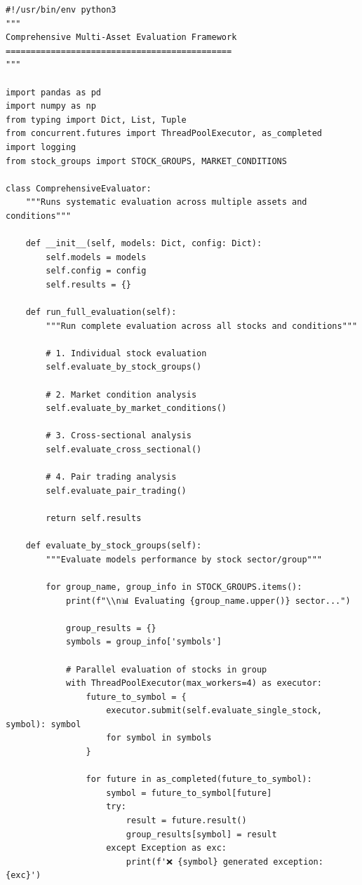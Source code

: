 \documentclass[11pt]{article}
\begin{document}
\begin{lstlisting}[style=pythonstyle, caption=Multi-Asset Evaluation Framework]
#!/usr/bin/env python3
"""
Comprehensive Multi-Asset Evaluation Framework
=============================================
"""

import pandas as pd
import numpy as np
from typing import Dict, List, Tuple
from concurrent.futures import ThreadPoolExecutor, as_completed
import logging
from stock_groups import STOCK_GROUPS, MARKET_CONDITIONS

class ComprehensiveEvaluator:
    """Runs systematic evaluation across multiple assets and conditions"""
    
    def __init__(self, models: Dict, config: Dict):
        self.models = models
        self.config = config
        self.results = {}
        
    def run_full_evaluation(self):
        """Run complete evaluation across all stocks and conditions"""
        
        # 1. Individual stock evaluation
        self.evaluate_by_stock_groups()
        
        # 2. Market condition analysis
        self.evaluate_by_market_conditions()
        
        # 3. Cross-sectional analysis
        self.evaluate_cross_sectional()
        
        # 4. Pair trading analysis
        self.evaluate_pair_trading()
        
        return self.results
        
    def evaluate_by_stock_groups(self):
        """Evaluate models performance by stock sector/group"""
        
        for group_name, group_info in STOCK_GROUPS.items():
            print(f"\\n📊 Evaluating {group_name.upper()} sector...")
            
            group_results = {}
            symbols = group_info['symbols']
            
            # Parallel evaluation of stocks in group
            with ThreadPoolExecutor(max_workers=4) as executor:
                future_to_symbol = {
                    executor.submit(self.evaluate_single_stock, symbol): symbol 
                    for symbol in symbols
                }
                
                for future in as_completed(future_to_symbol):
                    symbol = future_to_symbol[future]
                    try:
                        result = future.result()
                        group_results[symbol] = result
                    except Exception as exc:
                        print(f'❌ {symbol} generated exception: {exc}')
                        

\end{lstlisting}
\end{document}
